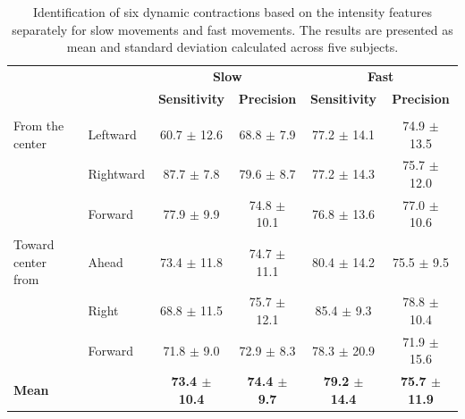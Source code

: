 \begin{table}[]
\centering
\caption{Identification of six dynamic contractions based on the intensity features separately for slow movements and fast movements. The results are presented as mean and standard deviation calculated across five subjects.}
\label{tb:4-3}
\begin{tabular}{llcccc}
                   &           & \multicolumn{2}{c}{\textbf{Slow}}          & \multicolumn{2}{c}{\textbf{Fast}}           \\
                   &           & \textbf{Sensitivity} & \textbf{Precision}  & \textbf{Sensitivity} & \textbf{Precision}   \\ \hline
                   &           &                      &                     &                      &                      \\
From the center    & Leftward  & 60.7 $\pm$ 12.6          & 68.8 $\pm$ 7.9          & 77.2 $\pm$ 14.1          & 74.9 $\pm$ 13.5          \\
                   & Rightward & 87.7 $\pm$ 7.8           & 79.6 $\pm$ 8.7          & 77.2 $\pm$ 14.3          & 75.7 $\pm$ 12.0          \\
                   & Forward   & 77.9 $\pm$ 9.9           & 74.8 $\pm$ 10.1         & 76.8 $\pm$ 13.6          & 77.0 $\pm$ 10.6          \\ \hline
Toward center from & Ahead     & 73.4 $\pm$ 11.8          & 74.7 $\pm$ 11.1         & 80.4 $\pm$ 14.2          & 75.5 $\pm$ 9.5           \\
                   & Right     & 68.8 $\pm$ 11.5          & 75.7 $\pm$ 12.1         & 85.4 $\pm$ 9.3           & 78.8 $\pm$ 10.4          \\
                   & Forward   & 71.8 $\pm$ 9.0           & 72.9 $\pm$ 8.3          & 78.3 $\pm$ 20.9          & 71.9 $\pm$ 15.6          \\ \hline
\textbf{Mean}      & \textbf{} & \textbf{73.4 $\pm$ 10.4} & \textbf{74.4 $\pm$ 9.7} & \textbf{79.2 $\pm$ 14.4} & \textbf{75.7 $\pm$ 11.9}
\end{tabular}
\end{table}


